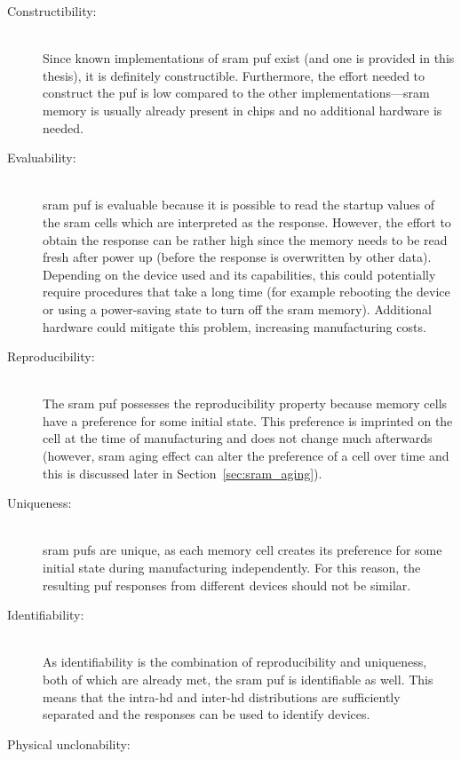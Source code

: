 \begin{description}
    \item[Constructibility:] \hfill \\
        Since known implementations of \gls{sram} \gls{puf} exist (and one is provided in this thesis), it is definitely constructible. Furthermore, the effort needed to construct the \gls{puf} is low compared to the other implementations---\gls{sram} memory is usually already present in chips and no additional hardware is needed.
    \item[Evaluability:] \hfill \\
        \gls{sram} \gls{puf} is evaluable because it is possible to read the startup values of the \gls{sram} cells which are interpreted as the response. However, the effort to obtain the response can be rather high since the memory needs to be read fresh after power up (before the response is overwritten by other data). Depending on the device used and its capabilities, this could potentially require procedures that take a long time (for example rebooting the device or using a power-saving state to turn off the \gls{sram} memory). Additional hardware could mitigate this problem, increasing manufacturing costs.
    \item[Reproducibility:] \hfill \\
        The \gls{sram} \gls{puf} possesses the reproducibility property because memory cells have a preference for some initial state. This preference is imprinted on the cell at the time of manufacturing and does not change much afterwards (however, \gls{sram} aging effect can alter the preference of a cell over time and this is discussed later in Section~\ref{sec:sram_aging}). 
    \item[Uniqueness:] \hfill \\
        \gls{sram} \glspl{puf} are unique, as each memory cell creates its preference for some initial state during manufacturing independently. For this reason, the resulting \gls{puf} responses from different devices should not be similar.
    \item[Identifiability:] \hfill \\
        As identifiability is the combination of reproducibility and uniqueness, both of which are already met, the \gls{sram} \gls{puf} is identifiable as well. This means that the intra-\gls{hd} and inter-\gls{hd} distributions are sufficiently separated and the responses can be used to identify devices.
    \item[Physical unclonability:] \hfill \\

\end{description}
